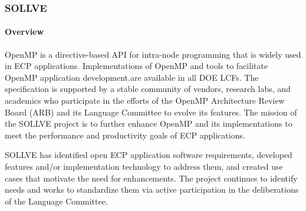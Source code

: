 \subsubsection{SOLLVE}\label{subsubsect:sollve}



\paragraph{Overview}
OpenMP is a directive-based API for intra-node programming that is widely used  in ECP applications. Implementations of OpenMP and  tools to facilitate OpenMP application development.are available in all DOE LCFs.  
The specification is supported by a stable community of vendors, research labs, and academics who
participate in the efforts of the  OpenMP Architecture Review Board (ARB) and its Language Committee to evolve its features.
The mission of the SOLLVE project is to further enhance  OpenMP and its implementations to meet the performance and productivity goals of ECP applications. 

SOLLVE has identified open ECP application software requirements, developed features and/or implementation technology to address them, and created use cases that motivate the need for enhancements. 
 The project continues to identify needs and works to standardize them via 
active participation in the deliberations of the Language Committee.  

